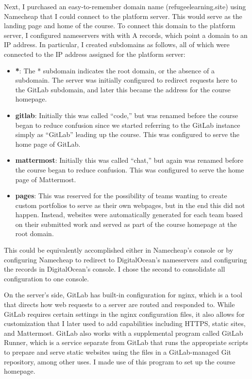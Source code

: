 \documentclass[12pt,twoside]{mitthesis}
\begin{document}
Next, I purchased an easy-to-remember domain name (refugeelearning.site) using Namecheap that I could connect to the platform server. This would serve as the landing page and home of the course. To connect this domain to the platform server, I configured nameservers with with A records, which point a domain to an IP address. In particular, I created subdomains as follows, all of which were connected to the IP address assigned for the platform server:
\begin{itemize}
\item \textbf{*}: The * subdomain indicates the root domain, or the absence of a subdomain. The server was initially configured to redirect requests here to the GitLab subdomain, and later this became the address for the course homepage.
\item \textbf{gitlab}: Initially this was called ``code,'' but was renamed before the course began to reduce confusion since we started referring to the GitLab instance simply as ``GitLab'' leading up the course. This was configured to serve the home page of GitLab.
\item \textbf{mattermost}: Initially this was called ``chat,'' but again was renamed before the course began to reduce confusion. This was configured to serve the home page of Mattermost.
\item \textbf{pages}: This was reserved for the possibility of teams wanting to create custom portfolios to serve as their own webpages, but in the end this did not happen. Instead, websites were automatically generated for each team based on their submitted work and served as part of the course homepage at the root domain.
\end{itemize}
This could be equivalently accomplished either in Namecheap's console or by configuring Namecheap to redirect to DigitalOcean's nameservers and configuring the records in DigitalOcean's console. I chose the second to consolidate all configuration to one console.

On the server's side, GitLab has built-in configuration for nginx, which is a tool that directs how web requests to a server are routed and responded to. While GitLab requires certain settings in the nginx configuration files, it also allows for customization that I later used to add capabilities including HTTPS, static sites, and Mattermost. GitLab also works with a supplemental program called GitLab Runner, which is a service separate from GitLab that runs the appropriate scripts to prepare and serve static websites using the files in a GitLab-managed Git repository, among other uses. I made use of this program to set up the course homepage.
\end{document}
